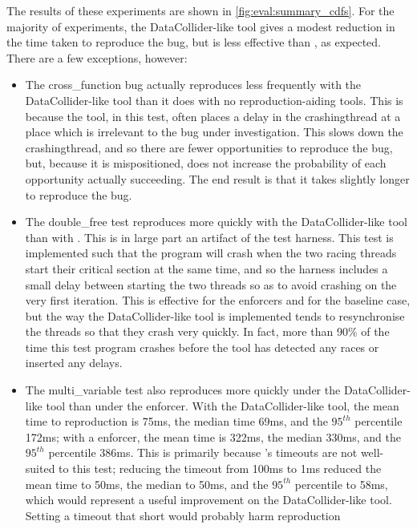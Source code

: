The results of these experiments are shown in
\autoref{fig:eval:summary_cdfs}.  For the majority of experiments,
the DataCollider-like tool gives a modest reduction in the time taken
to reproduce the bug, but is less effective than {\technique}, as
expected.  There are a few exceptions, however:

\begin{itemize}
\item The cross\_function bug actually reproduces less frequently with
  the DataCollider-like tool than it does with no reproduction-aiding
  tools.  This is because the tool, in this test, often places a delay
  in the \gls{crashingthread} at a place which is irrelevant to the
  bug under investigation.  This slows down the \gls{crashingthread},
  and so there are fewer opportunities to reproduce the bug, but,
  because it is mispositioned, does not increase the probability of
  each opportunity actually succeeding.  The end result is that it
  takes slightly longer to reproduce the bug.
\item The double\_free test reproduces more quickly with the
  DataCollider-like tool than with {\technique}.  This is in large
  part an artifact of the test harness.  This test is implemented such
  that the program will crash when the two racing threads start their
  critical section at the same time, and so the harness includes a
  small delay between starting the two threads so as to avoid crashing
  on the very first iteration.  This is effective for the {\technique}
  enforcers and for the baseline case, but the way the
  DataCollider-like tool is implemented tends to resynchronise the
  threads so that they crash very quickly.  In fact, more than 90\% of
  the time this test program crashes before the tool has detected any
  races or inserted any delays.
\item The multi\_variable test also reproduces more quickly under the
  DataCollider-like tool than under the {\technique} enforcer.  With
  the DataCollider-like tool, the mean time to reproduction is 75ms,
  the median time 69ms, and the $95^{th}$ percentile 172ms; with a
  {\technique} enforcer, the mean time is 322ms, the median 330ms, and
  the $95^{th}$ percentile 386ms.  This is primarily because
  {\technique}'s timeouts are not well-suited to this test; reducing
  the timeout from 100ms to 1ms reduced the mean time to 50ms, the
  median to 50ms, and the $95^{th}$ percentile to 58ms, which would
  represent a useful improvement on the DataCollider-like tool.
  Setting a timeout that short would probably harm reproduction

\end{itemize}
